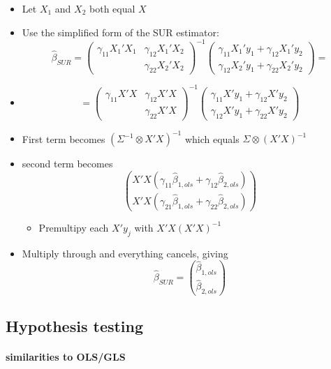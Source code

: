 \begin{itemize}
\item Let $X_1$ and $X_2$ both equal $X$
\item Use the simplified form of the SUR estimator:
        \[\hat\beta_{SUR} = (\begin{matrix} \gamma_{11} X_1'X_1 &
        \gamma_{12} X_1'X_2 \\ & \gamma_{22}
        X_2'X_2 \end{matrix})^{-1} (\begin{matrix} \gamma_{11}
        X_1'y_1 + \gamma_{12} X_1'y_2 \\ \gamma_{12} X_2'y_1 +
        \gamma_{22} X_2'y_2\end{matrix}) = \]
\item \[= (\begin{matrix} \gamma_{11} X'X & \gamma_{12} X'X \\ &
        \gamma_{22}X'X \end{matrix})^{-1} (\begin{matrix} \gamma_{11}
        X'y_1 + \gamma_{12}X'y_2 \\ \gamma_{12} X'y_1 + \gamma_{22}
        X'y_2\end{matrix})\]
\item First term becomes $(\Sigma^{-1} \otimes X'X)^{-1}$ which
        equals $\Sigma \otimes (X'X)^{-1}$
\item second term becomes \[\binom{X'X
        (\gamma_{11}\hat\beta_{1,ols} + \gamma_{12}\hat\beta_{2,ols})}{X'X
        (\gamma_{21}\hat\beta_{1,ols} +
        \gamma_{22}\hat\beta_{2,ols})}   \]
\begin{itemize}
\item Premultipy each $X'y_j$ with $X'X(X'X)^{-1}$
\end{itemize}
\item Multiply through and everything cancels, giving
        \[\hat\beta_{SUR} = \binom{\hat\beta_{1,ols}}{\hat\beta_{2,ols}}\]
\end{itemize}
\subsection{Hypothesis testing}
\label{sec-2-6}
\paragraph{similarities to OLS/GLS}
\label{sec-2-6-1}

